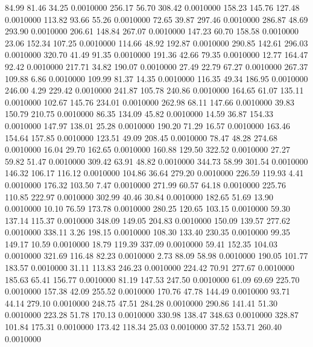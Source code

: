   84.99   81.46   34.25   0.0010000
 256.17   56.70  308.42   0.0010000
 158.23  145.76  127.48   0.0010000
 113.82   93.66   55.26   0.0010000
  72.65   39.87  297.46   0.0010000
 286.87   48.69  293.90   0.0010000
 206.61  148.84  267.07   0.0010000
 147.23   60.70  158.58   0.0010000
  23.06  152.34  107.25   0.0010000
 114.66   48.92  192.87   0.0010000
 290.85  142.61  296.03   0.0010000
 320.70   41.49   91.35   0.0010000
 191.36   42.66   79.35   0.0010000
  12.77  164.47   92.42   0.0010000
 217.71   34.82  190.07   0.0010000
  27.49   22.79   67.27   0.0010000
 267.37  109.88    6.86   0.0010000
 109.99   81.37   14.35   0.0010000
 116.35   49.34  186.95   0.0010000
 246.00    4.29  229.42   0.0010000
 241.87  105.78  240.86   0.0010000
 164.65   61.07  135.11   0.0010000
 102.67  145.76  234.01   0.0010000
 262.98   68.11  147.66   0.0010000
  39.83  150.79  210.75   0.0010000
  86.35  134.09   45.82   0.0010000
  14.59   36.87  154.33   0.0010000
 147.97  138.01   25.28   0.0010000
 190.20   71.29   16.57   0.0010000
 163.46  154.64  157.85   0.0010000
 123.51   49.09  208.45   0.0010000
  78.47   48.28  274.68   0.0010000
  16.04   29.70  162.65   0.0010000
 160.88  129.50  322.52   0.0010000
  27.27   59.82   51.47   0.0010000
 309.42   63.91   48.82   0.0010000
 344.73   58.99  301.54   0.0010000
 146.32  106.17  116.12   0.0010000
 104.86   36.64  279.20   0.0010000
 226.59  119.93    4.41   0.0010000
 176.32  103.50    7.47   0.0010000
 271.99   60.57   64.18   0.0010000
 225.76  110.85  222.97   0.0010000
 302.99   40.46   30.84   0.0010000
 182.65   51.69   13.90   0.0010000
  10.10   76.59  173.78   0.0010000
 280.25  120.65  103.15   0.0010000
  59.30  137.14  115.37   0.0010000
 348.09  149.05  204.83   0.0010000
 150.09  139.57  277.62   0.0010000
 338.11    3.26  198.15   0.0010000
 108.30  133.40  230.35   0.0010000
  99.35  149.17   10.59   0.0010000
  18.79  119.39  337.09   0.0010000
  59.41  152.35  104.03   0.0010000
 321.69  116.48   82.23   0.0010000
   2.73   88.09   58.98   0.0010000
 190.05  101.77  183.57   0.0010000
  31.11  113.83  246.23   0.0010000
 224.42   70.91  277.67   0.0010000
 185.63   65.41  156.77   0.0010000
  81.19  147.53  247.50   0.0010000
  61.09   69.69  225.70   0.0010000
 157.38   42.09  255.52   0.0010000
 170.76   47.78  144.49   0.0010000
  93.71   44.14  279.10   0.0010000
 248.75   47.51  284.28   0.0010000
 290.86  141.41   51.30   0.0010000
 223.28   51.78  170.13   0.0010000
 330.98  138.47  348.63   0.0010000
 328.87  101.84  175.31   0.0010000
 173.42  118.34   25.03   0.0010000
  37.52  153.71  260.40   0.0010000
